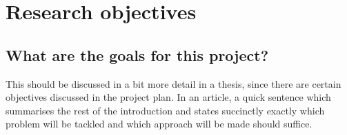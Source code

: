 \section{Research objectives}

\subsection{What are the goals for this project?}
This should be discussed in a bit more detail in a thesis, since there are certain objectives discussed in the project plan.
In an article, a quick sentence which summarises the rest of the introduction and states succinctly exactly which problem will be tackled and which approach will be made should suffice.
